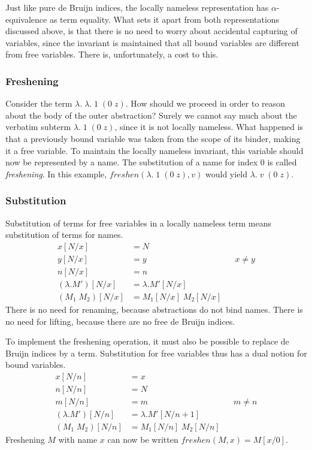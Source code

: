 \documentclass[a4paper,11pt]{article}
\begin{document}
Just like pure de Bruijn indices, the locally nameless representation
has $\alpha$-equivalence as term equality.
What sets it apart from both representations discussed above, is that
there is no need to worry about accidental capturing of variables,
since the invariant is maintained that all bound variables are
different from free variables.
There is, unfortunately, a cost to this.

\subsubsection*{Freshening}

Consider the term $\lambda . \; \lambda . \; 1 \; (0 \; z)$.
How should we proceed in order to reason about the body of the outer
abstraction?
Surely we cannot say much about the verbatim subterm
$\lambda . \; 1 \; (0 \; z)$, since it is not locally nameless.
What happened is that a previously bound variable was taken from the
scope of its binder, making it a free variable.
To maintain the locally nameless invariant, this variable should now be
represented by a name.
The substitution of a name for index $0$ is called {\em freshening}.
In this example, $\mathit{freshen}(\lambda . \; 1 \; (0 \; z), v)$ would yield
$\lambda . \; v \; (0 \; z)$.

\subsubsection*{Substitution}

Substitution of terms for free variables in a locally nameless term
means substitution of terms for names.
\begin{align*}
  x[N/x]             &= N\\
  y[N/x]             &= y                 && \text{$x \neq y$} \\
  n[N/x]             &= n\\
  (\lambda .M')[N/x] &= \lambda .M'[N/x]\\
  (M_1 \; M_2)[N/x]  &= M_1[N/x] \; M_2[N/x]
\end{align*}
There is no need for renaming, because abstractions do not bind names.
There is no need for lifting, because there are no free de Bruijn
indices.

To implement the freshening operation, it must also be possible to
replace de Bruijn indices by a term.
Substitution for free variables thus has a dual notion for bound
variables.
\begin{align*}
  x[N/n]             &= x\\
  n[N/n]             &= N\\
  m[N/n]             &= m                    && \text{$m \neq n$} \\
  (\lambda .M')[N/n] &= \lambda .M'[N / n\!+\!1]\\
  (M_1 \; M_2)[N/n]  &= M_1[N/n] \; M_2[N/n]
\end{align*}
Freshening $M$ with name $x$ can now be written
$\mathit{freshen}(M, x) = M[x/0]$.
\end{document}

